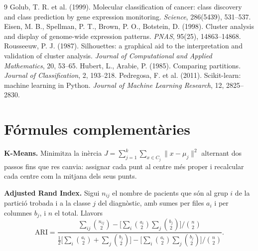 \documentclass[11pt,a4paper]{article}
\begin{document}
\vspace{0.4cm}
\begin{thebibliography}{9}
 Golub, T. R. et al. (1999). Molecular classification of cancer: class discovery and class prediction by gene expression monitoring. \textit{Science}, 286(5439), 531--537.
 Eisen, M. B., Spellman, P. T., Brown, P. O., Botstein, D. (1998). Cluster analysis and display of genome-wide expression patterns. \textit{PNAS}, 95(25), 14863--14868.
 Rousseeuw, P. J. (1987). Silhouettes: a graphical aid to the interpretation and validation of cluster analysis. \textit{Journal of Computational and Applied Mathematics}, 20, 53--65.
 Hubert, L., Arabie, P. (1985). Comparing partitions. \textit{Journal of Classification}, 2, 193--218.
 Pedregosa, F. et al. (2011). Scikit-learn: machine learning in Python. \textit{Journal of Machine Learning Research}, 12, 2825--2830.
\end{thebibliography}

\appendix
\vspace{0.4cm}
\section{Fórmules complementàries}
\label{ann:formules}
\small

\textbf{K-Means.} Minimitza la inèrcia $J=\sum_{j=1}^{k}\sum_{x\in C_j}\lVert x-\mu_j\rVert^2$ alternant dos passos fins que res canvia: assignar cada punt al centre més proper i recalcular cada centre com la mitjana dels seus punts.

\textbf{Adjusted Rand Index.} Sigui $n_{ij}$ el nombre de pacients que són al grup $i$ de la partició trobada i a la classe $j$ del diagnòstic, amb sumes per files $a_i$ i per columnes $b_j$, i $n$ el total. Llavors
\[
\mathrm{ARI}=\frac{\sum_{ij}\binom{n_{ij}}{2}-\Big[\sum_i\binom{a_i}{2}\sum_j\binom{b_j}{2}\Big]\Big/\binom{n}{2}}
{\tfrac12\Big[\sum_i\binom{a_i}{2}+\sum_j\binom{b_j}{2}\Big]-\Big[\sum_i\binom{a_i}{2}\sum_j\binom{b_j}{2}\Big]\Big/\binom{n}{2}}.
\]
\end{document}
